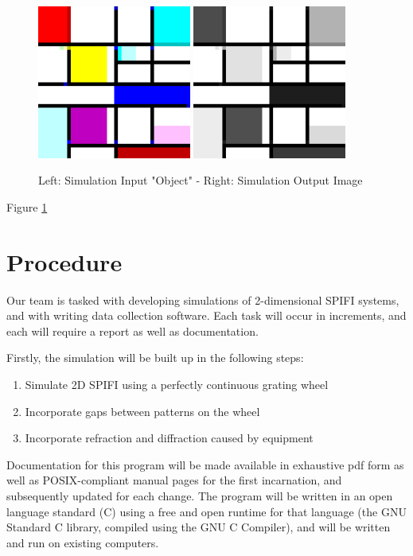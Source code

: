 \documentclass[12pt]{article}
\begin{document}
\begin{figure}[ht]
	\centering
	\includegraphics[width=0.45\textwidth]{testimg}
	\hfill
	\includegraphics[width=0.45\textwidth]{testoutput}
	\caption{Left: Simulation Input "Object" - Right: Simulation Output Image}
	\label{fig:sim-in-out}
\end{figure}

Figure \ref{fig:sim-in-out}


\section*{Procedure}
Our team is tasked with developing simulations of 2-dimensional SPIFI
systems, and with writing data collection software. Each task will occur
in increments, and each will require a report as well as documentation.

Firstly, the simulation will be built up in the following steps:
\begin{enumerate}
\item Simulate 2D SPIFI using a perfectly continuous grating wheel
\item Incorporate gaps between patterns on the wheel
\item Incorporate refraction and diffraction caused by equipment
\end{enumerate}
Documentation for this program will be made available in exhaustive pdf 
form as well as POSIX-compliant manual pages for the first incarnation, and
subsequently updated for each change. The program will be written in an
open language standard (C) using a free and open runtime for that 
language (the GNU Standard C library, compiled using the GNU C Compiler),
and will be written and run on existing computers.
\end{document}
